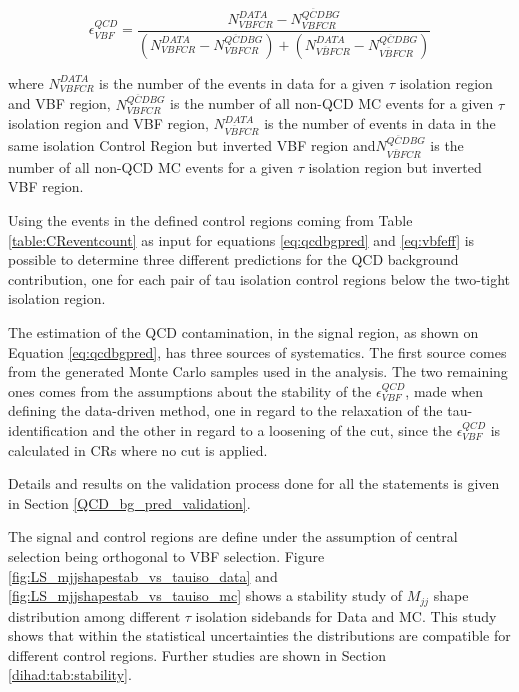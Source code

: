 \begin{equation}
\epsilon^{QCD}_{VBF} = \frac {N^{DATA}_{VBF CR} - N^{\overline{QCD} BG}_{VBFCR}}{\left( N^{DATA}_{VBFCR} - N^{\overline{QCD} BG}_{VBFCR} \right) + \left( N^{DATA}_{\overline{VBF}CR} - N^{\overline{QCD} BG}_{\overline{VBF}CR} \right) }
\label{eq:vbfeff}
\end{equation}

where $N^{DATA}_{VBF CR}$ is the number of the events in data for a given $ \tau $ isolation region and VBF region, $N^{\overline{QCD} BG}_{VBFCR}$ is the number of all non-QCD MC events for a given $ \tau $ isolation region and VBF region, $N^{DATA}_{\overline{VBF}CR}$ is the number of events in data in the same isolation Control Region but inverted VBF region and$N^{\overline{QCD} BG}_{\overline{VBF}CR}$ is the number of all non-QCD MC events for a given $ \tau $ isolation region but inverted VBF region.

Using the events in the defined control regions coming from Table \ref{table:CReventcount} as input for equations \ref{eq:qcdbgpred} and \ref{eq:vbfeff} is possible to determine three different predictions for the QCD background contribution, one for each pair of tau isolation control regions below the two-tight isolation region.

The estimation of the QCD contamination, in the signal region, as shown on Equation \ref{eq:qcdbgpred}, has three sources of systematics. The first source comes from the generated Monte Carlo samples used in the analysis. The two remaining ones comes from the assumptions about the stability of the $\epsilon^{QCD}_{VBF}$, made when defining the data-driven method, one in regard to the relaxation of the tau-identification and the other in regard to a loosening of the \met cut, since the $\epsilon^{QCD}_{VBF}$ is calculated in CRs where no \met cut is applied.

Details and results on the validation process done for all the statements is given in Section \ref{QCD_bg_pred_validation}.

The signal and control regions are define under the assumption of central selection being orthogonal to VBF selection. Figure \ref{fig:LS_mjjshapestab_vs_tauiso_data} and \ref{fig:LS_mjjshapestab_vs_tauiso_mc} shows a stability study of $M_{jj}$ shape distribution among different $\tau$ isolation sidebands for Data and MC. This study shows that within the statistical uncertainties the distributions are compatible for different control regions. Further studies are shown in Section \ref{dihad:tab:stability}.

